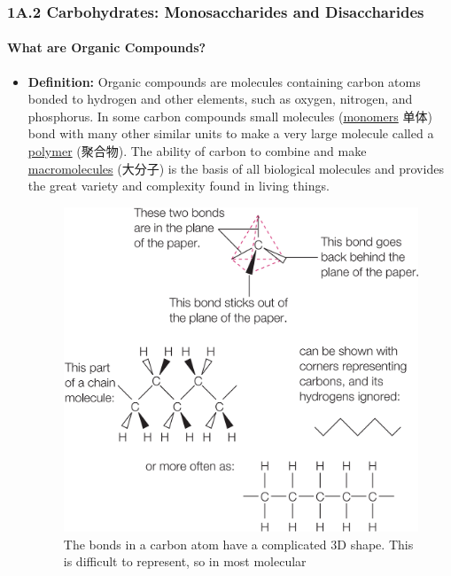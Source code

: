 
\subsubsection{1A.2 Carbohydrates: Monosaccharides and Disaccharides}
\paragraph{What are Organic Compounds?}
\begin{itemize}
    \item \textbf{Definition:} Organic compounds are molecules containing carbon atoms bonded to hydrogen and other elements, such
    as oxygen, nitrogen, and phosphorus. In some carbon compounds small molecules (\underline{monomers} 单体) bond with many
    other similar units to make a very large molecule called a \underline{polymer} (聚合物). The ability of carbon to combine and
    make \underline{macromolecules} (大分子) is the basis of all biological molecules and provides the great variety and
    complexity found in living things.
    \begin{figure}[H]
        \centering
        \includegraphics[scale=0.18]{Biology/1A/Images/1A-2-1.png}
        \caption{The bonds in a carbon atom have a complicated 3D shape. This is difficult to represent, so in most molecular
}
\end{figure}
\end{itemize}
